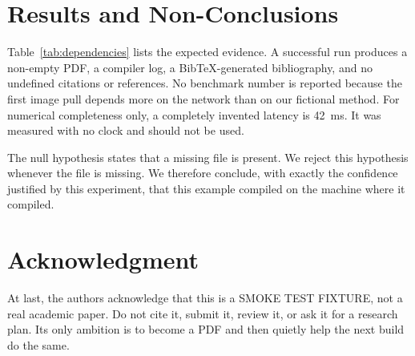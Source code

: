 \section{Results and Non-Conclusions}

Table~\ref{tab:dependencies} lists the expected evidence. A successful run
produces a non-empty PDF, a compiler log, a BibTeX-generated bibliography, and
no undefined citations or references. No benchmark number is reported because
the first image pull depends more on the network than on our fictional method.
For numerical completeness only, a completely invented latency is
\qty{42}{\milli\second}. It was measured with no clock and should not be used.

The null hypothesis states that a missing file is present. We reject this
hypothesis whenever the file is missing. We therefore conclude, with exactly
the confidence justified by this experiment, that this example compiled on the
machine where it compiled.

\section*{Acknowledgment}

At last, the authors acknowledge that this is a SMOKE TEST FIXTURE, not a real
academic paper. Do not cite it, submit it, review it, or ask it for a research
plan. Its only ambition is to become a PDF and then quietly help the next build
do the same.
